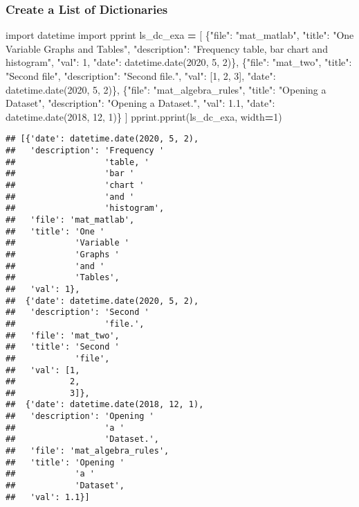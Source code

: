 \documentclass[
]{book}
\newenvironment{Shaded}{\begin{snugshade}}{\end{snugshade}}
\newcommand{\DecValTok}[1]{\textcolor[rgb]{0.00,0.00,0.81}{#1}}
\newcommand{\FloatTok}[1]{\textcolor[rgb]{0.00,0.00,0.81}{#1}}
\newcommand{\ImportTok}[1]{#1}
\newcommand{\NormalTok}[1]{#1}
\newcommand{\OperatorTok}[1]{\textcolor[rgb]{0.81,0.36,0.00}{\textbf{#1}}}
\newcommand{\StringTok}[1]{\textcolor[rgb]{0.31,0.60,0.02}{#1}}
\begin{document}
\hypertarget{create-a-list-of-dictionaries}{%
\subsubsection{Create a List of Dictionaries}\label{create-a-list-of-dictionaries}}

\begin{Shaded}
\begin{Highlighting}[]
\ImportTok{import}\NormalTok{ datetime}
\ImportTok{import}\NormalTok{ pprint}
\NormalTok{ls\_dc\_exa }\OperatorTok{=}\NormalTok{  [}
\NormalTok{    \{}\StringTok{"file"}\NormalTok{: }\StringTok{"mat\_matlab"}\NormalTok{,}
     \StringTok{"title"}\NormalTok{: }\StringTok{"One Variable Graphs and Tables"}\NormalTok{,}
     \StringTok{"description"}\NormalTok{: }\StringTok{"Frequency table, bar chart and histogram"}\NormalTok{,}
     \StringTok{"val"}\NormalTok{: }\DecValTok{1}\NormalTok{,}
     \StringTok{"date"}\NormalTok{: datetime.date(}\DecValTok{2020}\NormalTok{, }\DecValTok{5}\NormalTok{, }\DecValTok{2}\NormalTok{)\},}
\NormalTok{    \{}\StringTok{"file"}\NormalTok{: }\StringTok{"mat\_two"}\NormalTok{,}
     \StringTok{"title"}\NormalTok{: }\StringTok{"Second file"}\NormalTok{,}
     \StringTok{"description"}\NormalTok{: }\StringTok{"Second file."}\NormalTok{,}
     \StringTok{"val"}\NormalTok{: [}\DecValTok{1}\NormalTok{, }\DecValTok{2}\NormalTok{, }\DecValTok{3}\NormalTok{],}
     \StringTok{"date"}\NormalTok{: datetime.date(}\DecValTok{2020}\NormalTok{, }\DecValTok{5}\NormalTok{, }\DecValTok{2}\NormalTok{)\},}
\NormalTok{    \{}\StringTok{"file"}\NormalTok{: }\StringTok{"mat\_algebra\_rules"}\NormalTok{,}
     \StringTok{"title"}\NormalTok{: }\StringTok{"Opening a Dataset"}\NormalTok{,}
     \StringTok{"description"}\NormalTok{: }\StringTok{"Opening a Dataset."}\NormalTok{,}
     \StringTok{"val"}\NormalTok{: }\FloatTok{1.1}\NormalTok{,}
     \StringTok{"date"}\NormalTok{: datetime.date(}\DecValTok{2018}\NormalTok{, }\DecValTok{12}\NormalTok{, }\DecValTok{1}\NormalTok{)\}}
\NormalTok{]}
\NormalTok{pprint.pprint(ls\_dc\_exa, width}\OperatorTok{=}\DecValTok{1}\NormalTok{)}
\end{Highlighting}
\end{Shaded}

\begin{verbatim}
## [{'date': datetime.date(2020, 5, 2),
##   'description': 'Frequency '
##                  'table, '
##                  'bar '
##                  'chart '
##                  'and '
##                  'histogram',
##   'file': 'mat_matlab',
##   'title': 'One '
##            'Variable '
##            'Graphs '
##            'and '
##            'Tables',
##   'val': 1},
##  {'date': datetime.date(2020, 5, 2),
##   'description': 'Second '
##                  'file.',
##   'file': 'mat_two',
##   'title': 'Second '
##            'file',
##   'val': [1,
##           2,
##           3]},
##  {'date': datetime.date(2018, 12, 1),
##   'description': 'Opening '
##                  'a '
##                  'Dataset.',
##   'file': 'mat_algebra_rules',
##   'title': 'Opening '
##            'a '
##            'Dataset',
##   'val': 1.1}]
\end{verbatim}
\end{document}
